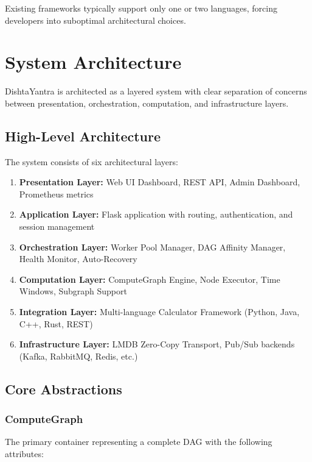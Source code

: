 \documentclass[11pt,a4paper]{article}
\begin{document}
Existing frameworks typically support only one or two languages, forcing developers into suboptimal architectural choices.

\section{System Architecture}

DishtaYantra is architected as a layered system with clear separation of concerns between presentation, orchestration, computation, and infrastructure layers.

\subsection{High-Level Architecture}

The system consists of six architectural layers:

\begin{enumerate}
    \item \textbf{Presentation Layer:} Web UI Dashboard, REST API, Admin Dashboard, Prometheus metrics
    \item \textbf{Application Layer:} Flask application with routing, authentication, and session management
    \item \textbf{Orchestration Layer:} Worker Pool Manager, DAG Affinity Manager, Health Monitor, Auto-Recovery
    \item \textbf{Computation Layer:} ComputeGraph Engine, Node Executor, Time Windows, Subgraph Support
    \item \textbf{Integration Layer:} Multi-language Calculator Framework (Python, Java, C++, Rust, REST)
    \item \textbf{Infrastructure Layer:} LMDB Zero-Copy Transport, Pub/Sub backends (Kafka, RabbitMQ, Redis, etc.)
\end{enumerate}

\subsection{Core Abstractions}

\subsubsection{ComputeGraph}

The primary container representing a complete DAG with the following attributes:
\end{document}
